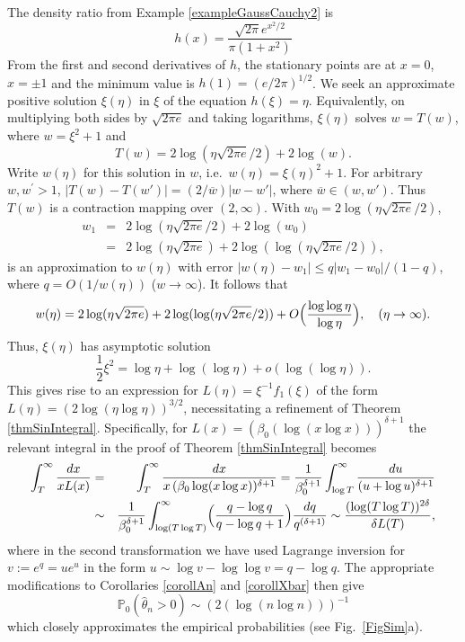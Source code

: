 \documentclass[11pt]{article}
\theoremstyle{definition}
\newcommand{\PP}{\mathbb{P}}
\def\vhalf{\textstyle{\frac 1 2}}
\begin{document}
\begin{appendix}
The density ratio from Example \ref{exampleGaussCauchy2} is
\[
h(x) = \frac{\sqrt{2\pi} e^{x^2/2}}{\pi (1+x^2)}
\]
From the first and second derivatives of $h$, the stationary points are at $x=0$, $x=\pm 1$ and the minimum value is $h(1)=(e/2\pi)^{1/2}$. We seek an approximate positive solution $\xi(\eta)$ in $\xi$ of the equation $h(\xi)=\eta$. Equivalently, on multiplying both sides by $\sqrt{2\pi e}$ and taking logarithms, $\xi(\eta)$ solves $w=T(w)$, where $w=\xi^2+1$ and
\[
T(w) =2 \log(\eta \sqrt{2\pi e}/2) + 2\log(w).
\]
Write $w(\eta)$ for this solution in $w$, i.e.~$w(\eta)=\xi(\eta)^2+1$. For arbitrary $w,w^\prime>1$, $|T(w)-T(w')|=(2/\overline{w})|w-w'|$, where $\overline{w}\in(w,w')$. Thus $T(w)$ is a contraction mapping over $(2,\infty)$. With $w_0 = 2\log(\eta\sqrt{2\pi e}/2)$,
%
\begin{eqnarray*}
	w_1 &=& 2\log (\eta\sqrt{2\pi e}/2) + 2\log(w_0) \\
	&=& 2\log(\eta\sqrt{2\pi e}) + 2\log (\log(\eta\sqrt{2\pi e}/2)),
\end{eqnarray*}
%
is an approximation to $w(\eta)$ with error $|w(\eta)- w_1|\leq q|w_1-w_0|/(1-q)$, where $q=O(1/w(\eta))$ ($w\rightarrow \infty$). It follows that 
\[
w(\eta)= 2\log(\eta\sqrt{2\pi e }) + 2\log(\log(\eta\sqrt{2\pi e }/2)) + O\Bigl(\frac{\log\log \eta}{\log \eta}\Bigr), \quad (\eta\rightarrow \infty).
\]
Thus, $\xi(\eta)$ has asymptotic solution
\[
\vhalf \xi^2 = \log \eta + \log(\log \eta) + o(\log(\log \eta)).
\]
This gives rise to an expression for $L(\eta)=\xi^{-1}f_1(\xi)$ of the form $L(\eta)=(2 \log (\eta\log\eta))^{3/2}$, necessitating a refinement of Theorem \ref{thmSinIntegral}. Specifically, for 
$L(x)=(\beta_0 (\log(x\log x)))^{\delta+1}$ the relevant integral in the proof of Theorem \ref{thmSinIntegral} becomes
%
\begin{eqnarray*}
	\int_T^\infty \frac{dx}{xL(x)} &=&
	\int_T^\infty \frac {dx}{x\, (\beta_0\log (x\log x))^{\delta + 1}} = \frac{1}{\beta_0^{\delta+1}}\int_{\log T}^\infty \frac {du}{(u + \log u)^{\delta + 1}} \\
    &\sim& \frac{1}{\beta_0^{\delta+1}} \int_{\log(T\log T)}^{\infty}\Bigl(\frac{q - \log q}{q-\log q + 1} \Bigr)\frac{dq}{q^{(\delta+1)}} \sim 
	\frac{(\log (T\log T))^{2\delta}}{\delta L(T)},
\end{eqnarray*}
%
where in the second transformation we have used Lagrange inversion \citep[][p.~25]{deBruijn1958} for $v:=e^q=ue^u$ in the form $u\sim \log v - \log \log v = q-\log q$. The appropriate modifications to Corollaries \ref{corollAn} and \ref{corollXbar} then give 
\[
\PP_0(\hat \theta_n >0) \sim (2(\log(n\log n)))^{-1}
\]
which closely approximates the empirical probabilities (see Fig.~\ref{FigSim}a).


\end{appendix}
\end{document}
